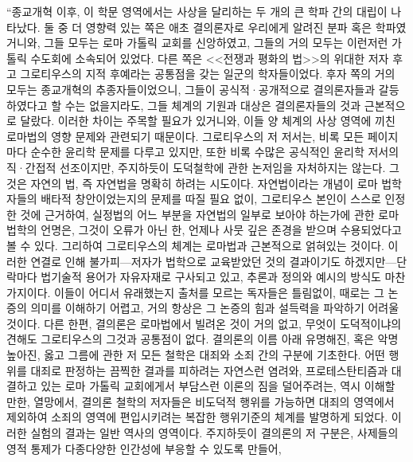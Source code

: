 ``종교개혁 이후,
이 학문 영역에서는
사상을 달리하는 두 개의 큰 학파 간의 대립이 나타났다.
둘 중 더 영향력 있는 쪽은 애초
결의론자로 우리에게 알려진 분파 혹은 학파였거니와,
그들 모두는 로마 가톨릭 교회를 신앙하였고,
그들의 거의 모두는 이런저런 가톨릭 수도회에 소속되어 있었다.
다른 쪽은
<<전쟁과 평화의 법>>의 위대한 저자
후고 그로티우스의 지적 후예라는 공통점을 갖는
일군의 학자들이었다.
후자 쪽의 거의 모두는 종교개혁의 추종자들이었으니,
그들이 공식적^^b7공개적으로 결의론자들과 갈등하였다고 할 수는 없을지라도,
그들 체계의 기원과 대상은 결의론자들의 것과 근본적으로 달랐다.
이러한 차이는 주목할 필요가 있거니와,
이들 양 체계의 사상 영역에 끼친 로마법의 영향 문제와 관련되기 때문이다.
그로티우스의 저 저서는,
비록 모든 페이지마다 순수한 윤리학 문제를 다루고 있지만,
또한 비록 수많은 공식적인 윤리학 저서의 직^^b7간접적 선조이지만,
주지하듯이 도덕철학에 관한 논저임을 자처하지는 않는다.
그것은 자연의 법,
즉 자연법을 명확히 하려는 시도이다.
자연법이라는 개념이 로마 법학자들의 배타적 창안이었는지의
문제를 따질 필요 없이,
그로티우스 본인이 스스로 인정한 것에 근거하여,
실정법의 어느 부분을 자연법의 일부로 보아야 하는가에 관한
로마 법학의 언명은,
그것이 오류가 아닌 한,
언제나
사뭇 깊은 존경을 받으며 수용되었다고
볼 수 있다.
그리하여 그로티우스의 체계는
로마법과 근본적으로 얽혀있는 것이다.
이러한 연결로 인해 불가피---저자가 법학으로 교육받았던 것의
결과이기도 하겠지만---단락마다
법기술적 용어가 자유자재로 구사되고 있고,
추론과
정의와 예시의 방식도 마찬가지이다.
이들이 어디서 유래했는지 출처를 모르는 독자들은 틀림없이,
때로는 그 논증의 의미를 이해하기 어렵고,
거의 항상은 그 논증의 힘과 설득력을 파악하기 어려울 것이다.
다른 한편,
결의론은 로마법에서 빌려온 것이 거의 없고,
무엇이 도덕적이냐의 견해도 그로티우스의 그것과 공통점이 없다.
결의론의 이름 아래 유명해진, 혹은 악명높아진, 옳고 그름에 관한 저 모든 철학은
대죄와
소죄 간의 구분에 기초한다.
어떤 행위를 대죄로 판정하는 끔찍한 결과를 피하려는 자연스런 염려와,
프로테스탄티즘과 대결하고 있는 로마 가톨릭 교회에게서
부담스런 이론의 짐을 덜어주려는, 역시 이해할 만한, 열망에서,
결의론 철학의 저자들은
비도덕적 행위를 가능하면 대죄의 영역에서 제외하여
소죄의 영역에 편입시키려는 복잡한 행위기준의 체계를 발명하게 되었다.
이러한 실험의 결과는 일반 역사의 영역이다.
주지하듯이 결의론의 저 구분은,
사제들의 영적 통제가 다종다양한 인간성에 부응할 수 있도록 만들어,

